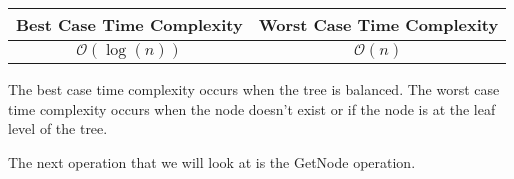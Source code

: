 \begin{highlight}
\begin{center}
    \begin{tabular}[ht]{|c|c|}
        \hline \textbf{Best Case Time Complexity} & \textbf{Worst Case Time Complexity} \\ \hline
        $\mathcal{O}(\log{(n)})$ & $\mathcal{O}(n)$ \\ \hline
    \end{tabular}
\end{center}

\noindent The best case time complexity occurs when the tree is balanced. The worst case time complexity occurs when the node doesn't exist or if the node is at the leaf level of the tree.

\end{highlight}

The next operation that we will look at is the GetNode operation.


